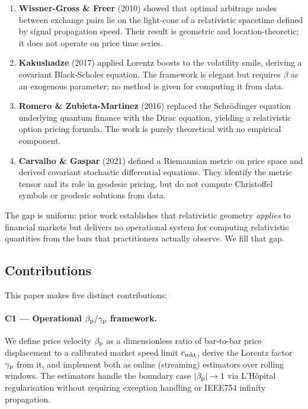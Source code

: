 \begin{enumerate}
  \item \textbf{Wissner-Gross \& Freer} (2010) showed that optimal
        arbitrage nodes between exchange pairs lie on the light-cone of a
        relativistic spacetime defined by signal propagation speed.  Their
        result is geometric and location-theoretic; it does not operate on
        price time series.

  \item \textbf{Kakushadze} (2017) applied Lorentz boosts to the
        volatility smile, deriving a covariant Black-Scholes equation.  The
        framework is elegant but requires $\beta$ as an exogenous parameter;
        no method is given for computing it from \ohlcv{} data.

  \item \textbf{Romero \& Zubieta-Martinez} (2016) replaced the
        Schrödinger equation underlying quantum finance with the Dirac
        equation, yielding a relativistic option pricing formula.  The work
        is purely theoretical with no empirical component.

  \item \textbf{Carvalho \& Gaspar} (2021) defined a Riemannian metric on
        price space and derived covariant stochastic differential equations.
        They identify the metric tensor and its role in geodesic pricing, but
        do not compute Christoffel symbols or geodesic solutions from data.
\end{enumerate}

\noindent
The gap is uniform: prior work establishes that relativistic geometry
\emph{applies} to financial markets but delivers no operational system for
computing relativistic quantities from the \ohlcv{} bars that practitioners
actually observe.  We fill that gap.

\subsection{Contributions}

This paper makes five distinct contributions:

\paragraph{C1 — Operational $\beta_{\mathrm{p}}/\gamma_{\mathrm{p}}$ framework.}
We define price velocity $\beta_{\mathrm{p}}$ as a dimensionless ratio of bar-to-bar
price displacement to a calibrated market speed limit $c_{\mathrm{mkt}}$, derive the
Lorentz factor $\gamma_{\mathrm{p}}$ from it, and implement both as online (streaming)
estimators over rolling \ohlcv{} windows.  The estimators handle the boundary
case $|\beta_{\mathrm{p}}| \to 1$ via L'Hôpital regularisation without requiring
exception handling or IEEE754 infinity propagation.

